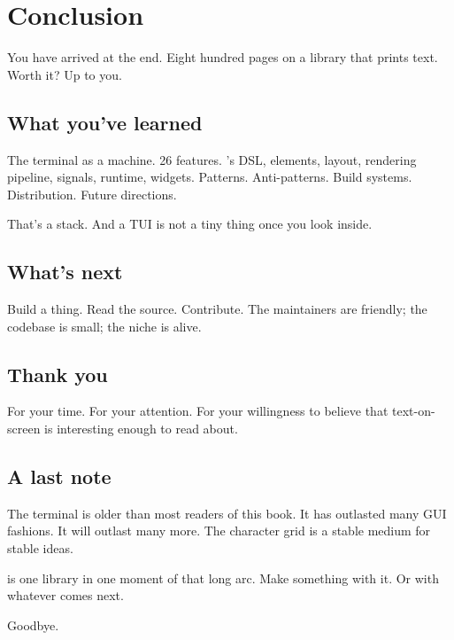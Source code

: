 \chapter{Conclusion}
\label{ch:conclusion}

\begin{aside}
You have arrived at the end. Eight hundred pages on a library
that prints text. Worth it? Up to you.
\end{aside}

\section{What you've learned}

The terminal as a machine. \cpp{}26 features. \maya{}'s DSL,
elements, layout, rendering pipeline, signals, runtime,
widgets. Patterns. Anti-patterns. Build systems. Distribution.
Future directions.

That's a stack. And a TUI is not a tiny thing once you look
inside.

\section{What's next}

Build a thing. Read the source. Contribute. The maintainers
are friendly; the codebase is small; the niche is alive.

\section{Thank you}

For your time. For your attention. For your willingness to
believe that text-on-screen is interesting enough to read
about.

\section{A last note}

The terminal is older than most readers of this book. It has
outlasted many GUI fashions. It will outlast many more. The
character grid is a stable medium for stable ideas.

\maya{} is one library in one moment of that long arc. Make
something with it. Or with whatever comes next.

\medskip

Goodbye.
